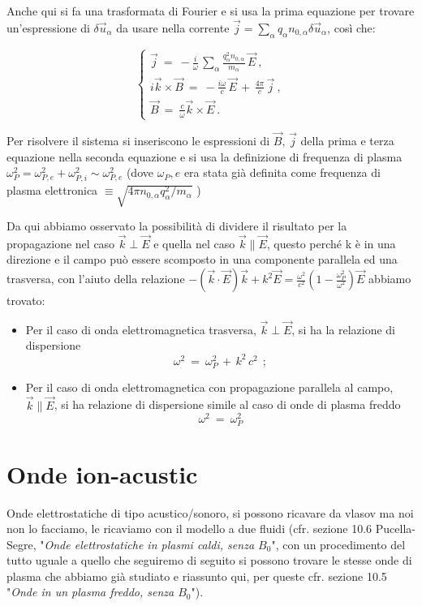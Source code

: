 Anche qui si fa una trasformata di Fourier e si usa la prima equazione per trovare un'espressione di $\delta \vec u_\alpha$ da usare nella corrente $\vec j = \sum_\alpha q_\alpha n_{0,\alpha}\delta \vec u_\alpha$, così che:

\[\begin{cases}
	\vec j\ =\ -\frac{i}{\omega}\,  \sum_\alpha \frac{q^2_\alpha n_{0,\alpha} }{m_\alpha}\,\vec E\ ,\\
	i\vec k \times \vec B \ =\ -\frac{i\omega}{c}\,\vec E\, +\, \frac{4\pi}{c}\,\vec j\ ,\\
	\vec B\ =\ \frac{c}{\omega}\vec k\times \vec E\ .
\end{cases}\]

Per risolvere il sistema si inseriscono le espressioni di $\vec B,\, \vec j$ della prima e terza equazione nella seconda equazione e si usa la definizione di frequenza di plasma $\omega_P^2=\omega^2_{P,e}+\omega^2_{P,i}\sim\omega^2_{P,e}$ (dove $\omega_P,e$ era stata già definita come frequenza di plasma elettronica $\equiv \sqrt{4\pi n_{0,\alpha} q^2_\alpha / m_\alpha}$ )

Da qui abbiamo osservato la possibilità di dividere il risultato per la propagazione nel caso $\vec k\perp \vec E$ e quella nel caso $\vec k\parallel \vec E$, questo perché k è in una direzione e il campo può essere scomposto in una componente parallela ed una trasversa, con l'aiuto della relazione $-(\vec k\cdot \vec E)\vec k+k^2\vec E = \frac{\omega^2}{c^2} \left(1-\frac{\omega^2_P}{\omega^2}\right)\vec E$ abbiamo trovato:
\begin{itemize}
	\item Per il caso di onda elettromagnetica trasversa, $\vec k\perp \vec E$, si ha la relazione di dispersione
	\[\omega^2\ =\ \omega_P^2\, +\, k^2\,c^2\ \ ;\]
	\item Per il caso di onda elettromagnetica con propagazione parallela al campo, $\vec k\parallel \vec E$, si ha relazione di dispersione simile al caso di onde di plasma freddo
	\[\omega^2\ =\ \omega^2_P\]
\end{itemize}


\section{Onde ion-acustic}


Onde elettrostatiche di tipo acustico/sonoro, si possono ricavare da vlasov ma noi non lo facciamo, le ricaviamo con il modello a due fluidi (cfr. sezione 10.6 Pucella-Segre, "\emph{Onde elettrostatiche in plasmi caldi, senza $B_0$}", con un procedimento del tutto uguale a quello che seguiremo di seguito si possono trovare le stesse onde di plasma che abbiamo già studiato e riassunto qui, per queste cfr. sezione 10.5 "\emph{Onde in un plasma freddo, senza $B_0$}"). 

